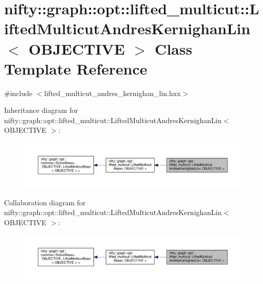 \hypertarget{classnifty_1_1graph_1_1opt_1_1lifted__multicut_1_1LiftedMulticutAndresKernighanLin}{}\section{nifty\+:\+:graph\+:\+:opt\+:\+:lifted\+\_\+multicut\+:\+:Lifted\+Multicut\+Andres\+Kernighan\+Lin$<$ O\+B\+J\+E\+C\+T\+I\+VE $>$ Class Template Reference}
\label{classnifty_1_1graph_1_1opt_1_1lifted__multicut_1_1LiftedMulticutAndresKernighanLin}


{\ttfamily \#include $<$lifted\+\_\+multicut\+\_\+andres\+\_\+kernighan\+\_\+lin.\+hxx$>$}



Inheritance diagram for nifty\+:\+:graph\+:\+:opt\+:\+:lifted\+\_\+multicut\+:\+:Lifted\+Multicut\+Andres\+Kernighan\+Lin$<$ O\+B\+J\+E\+C\+T\+I\+VE $>$\+:
\nopagebreak
\begin{figure}[H]
\begin{center}
\leavevmode
\includegraphics[width=350pt]{classnifty_1_1graph_1_1opt_1_1lifted__multicut_1_1LiftedMulticutAndresKernighanLin__inherit__graph}
\end{center}
\end{figure}


Collaboration diagram for nifty\+:\+:graph\+:\+:opt\+:\+:lifted\+\_\+multicut\+:\+:Lifted\+Multicut\+Andres\+Kernighan\+Lin$<$ O\+B\+J\+E\+C\+T\+I\+VE $>$\+:
\nopagebreak
\begin{figure}[H]
\begin{center}
\leavevmode
\includegraphics[width=350pt]{classnifty_1_1graph_1_1opt_1_1lifted__multicut_1_1LiftedMulticutAndresKernighanLin__coll__graph}
\end{center}
\end{figure}
